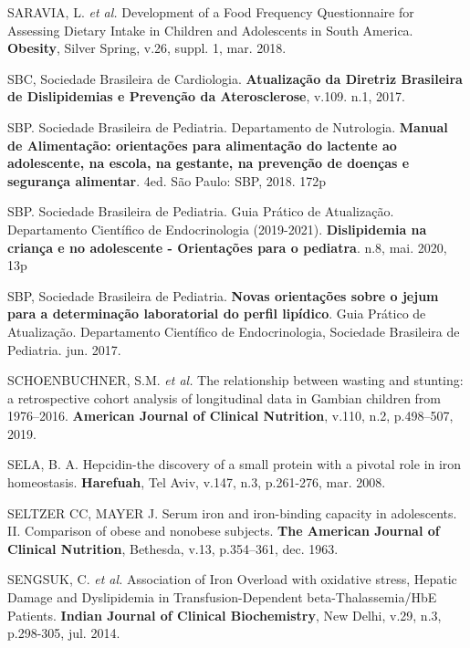 \bigbreak

\noindent SARAVIA, L. \textit{et al.} Development of a Food Frequency Questionnaire for Assessing Dietary Intake in Children and Adolescents in South America. \textbf{Obesity}, Silver Spring, v.26, suppl. 1, mar. 2018.

\bigbreak

\noindent SBC, Sociedade Brasileira de Cardiologia.  \textbf{Atualização da Diretriz Brasileira de Dislipidemias e Prevenção da Aterosclerose}, v.109. n.1, 2017.

\bigbreak

\noindent SBP. Sociedade Brasileira de Pediatria. Departamento de Nutrologia. \textbf{Manual de Alimentação: orientações para alimentação do lactente ao adolescente, na escola, na gestante, na prevenção de doenças e segurança alimentar}. 4ed. São Paulo: SBP, 2018. 172p

\bigbreak

\noindent SBP. Sociedade Brasileira de Pediatria. Guia Prático de Atualização. Departamento Científico de Endocrinologia (2019-2021). \textbf{Dislipidemia na criança e no adolescente - Orientações para o pediatra}. n.8, mai. 2020, 13p

\bigbreak

\noindent SBP, Sociedade Brasileira de Pediatria. \textbf{Novas orientações sobre o jejum para a determinação laboratorial do perfil lipídico}. Guia Prático de Atualização. Departamento Científico de Endocrinologia, Sociedade Brasileira de Pediatria. jun. 2017.

\bigbreak

\noindent SCHOENBUCHNER, S.M. \textit{et al.} The relationship between wasting and stunting: a retrospective cohort analysis of longitudinal data in Gambian children from 1976–2016. \textbf{American Journal of Clinical Nutrition}, v.110, n.2, p.498–507, 2019.

\bigbreak

\noindent SELA, B. A. Hepcidin-the discovery of a small protein with a pivotal role in iron homeostasis. \textbf{Harefuah}, Tel Aviv, v.147, n.3, p.261-276, mar. 2008.

\bigbreak

\noindent SELTZER CC, MAYER J. Serum iron and iron-binding capacity in adolescents. II. Comparison of obese and nonobese subjects. \textbf{The American Journal of Clinical Nutrition}, Bethesda, v.13, p.354–361, dec. 1963. 

\bigbreak

\noindent SENGSUK, C. \textit{et al.} Association of Iron Overload with oxidative stress, Hepatic Damage and Dyslipidemia in Transfusion-Dependent beta-Thalassemia/HbE Patients. \textbf{Indian Journal of Clinical Biochemistry}, New Delhi, v.29, n.3, p.298-305, jul. 2014.

